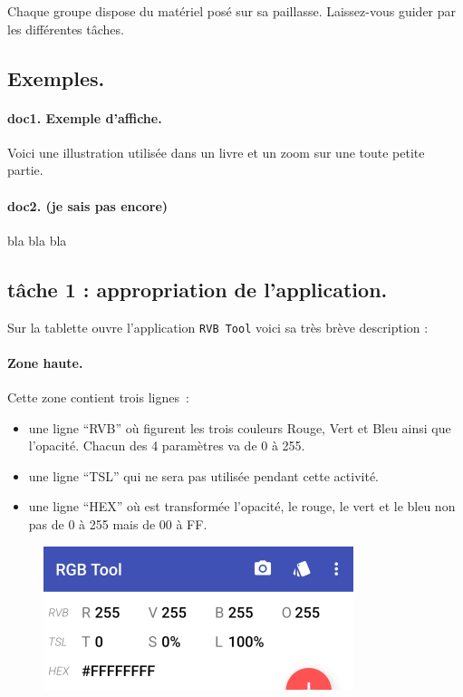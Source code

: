 \documentclass[12pt,a4paper,notitlepage]{article}
\begin{document}
Chaque groupe dispose du matériel posé sur sa paillasse. 
Laissez-vous guider par les différentes tâches.

\subsection*{Exemples.}
\paragraph*{doc1. Exemple d'affiche.}
Voici une illustration utilisée dans un livre et un zoom sur une toute petite partie.

\paragraph*{doc2. (je sais pas encore)}
bla bla bla

\subsection*{tâche 1 : appropriation de l'application.}
Sur la tablette ouvre l'application \texttt{RVB Tool} voici sa très brève description :

\paragraph{Zone haute.}
Cette zone contient trois lignes~:
\begin{itemize}
	\item une ligne ``RVB'' où figurent les trois couleurs Rouge, Vert et Bleu ainsi que l'opacité. Chacun des 4 paramètres va de 0 à 255.
	\item une ligne ``TSL'' qui ne sera pas utilisée pendant cette activité.
	\item une ligne ``HEX'' où est transformée l'opacité, le rouge, le vert et le bleu non pas de 0 à 255 mais de 00 à FF.
\end{itemize}
\begin{figure}
	\centering
	\includegraphics{zone-haute.png}
\end{figure}
\end{document}
